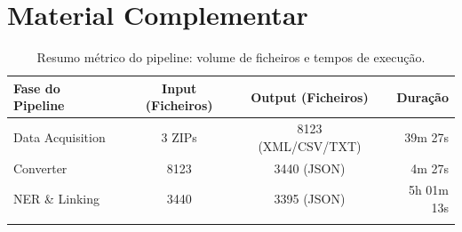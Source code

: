 \chapter{Material Complementar} 
\label{material complementar}
\begin{table}[H]
\centering
\caption{Resumo métrico do pipeline: volume de ficheiros e tempos de execução.}
\label{tab:pipeline_summary}
\footnotesize
\begin{tabular}{|l|c|c|r|}
\hline
\textbf{Fase do Pipeline} & \textbf{Input (Ficheiros)} & \textbf{Output (Ficheiros)} & \textbf{Duração} \\ \hline
Data Acquisition & 3 ZIPs & 8123 (XML/CSV/TXT) & 39m 27s \\ \hline
Converter & 8123 & 3440 (JSON) & 4m 27s \\ \hline
NER \& Linking & 3440 & 3395 (JSON) & 5h 01m 13s \\ \hline
\rowcolor[HTML]{EFEFEF}
\end{tabular}
\end{table}
